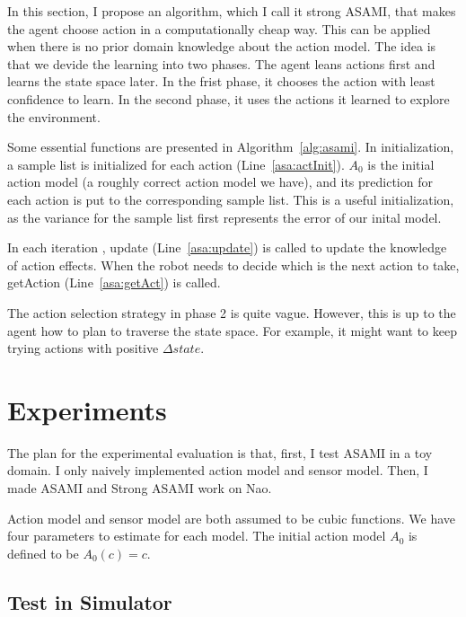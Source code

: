 \documentclass[10pt]{IEEEtran}
\begin{document}
In this section, I propose an algorithm, which I call it strong ASAMI,
that makes the agent choose action in a computationally cheap way.
This can be applied when there is no prior domain knowledge about
the action model. The idea is that we devide the learning into two
phases. The agent leans actions first and learns the state space
later. In the frist phase, it chooses the action with least confidence
to learn. In the second phase, it uses the actions it learned to
explore the environment.

Some essential functions are presented in Algorithm~\ref{alg:asami}.
In initialization, a sample list is initialized for each action
(Line~\ref{asa:actInit}). $A_0$ is the initial action model (a roughly
correct action model we have), and its prediction for each action is
put to the corresponding sample list.  This is a useful
initialization, as the variance for the sample list first represents
the error of our inital model.

In each iteration , update (Line~\ref{asa:update}) is called to update
the knowledge of action effects. When the robot needs to decide which
is the next action to take, getAction (Line~\ref{asa:getAct}) is
called.

The action selection strategy in phase 2 is quite vague. However, this
is up to the agent how to plan to traverse the state space. For
example, it might want to keep trying actions with positive $\Delta
state$.

\section{Experiments}

The plan for the experimental evaluation is that, first, I test ASAMI
in a toy domain. I only naively implemented action model and sensor
model. Then, I made ASAMI and Strong ASAMI work on Nao.

Action model and sensor model are both assumed to be cubic functions.
We have four parameters to estimate for each model. The initial action
model $A_0$ is defined to be $A_0(c) = c$.

\subsection{Test in Simulator}
\end{document}
